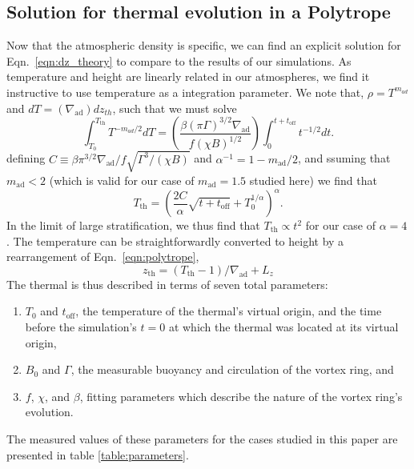 \documentclass[twocolumn, amsmath, amsfonts, amssymb, trackchanges]{aastex62}
\newcommand{\grad}{\ensuremath{\nabla}}
\begin{document}
\subsection{Solution for thermal evolution in a Polytrope}
Now that the atmospheric density is specific, we can 
find an explicit solution for Eqn.~\ref{eqn:dz_theory} to compare
to the results of our simulations. As temperature and height are
linearly related in our atmospheres, we find it instructive to use
temperature as a integration parameter.
We note that, $\rho = T^{m_{ad}}$ and
$dT = (\grad_{\text{ad}}) dz_{th}$, such that we must solve
\begin{equation}
\int_{T_0}^{T_{\text{th}}} T^{-m_{ad}/2} dT 
= \left(\frac{\beta(\pi\Gamma)^{3/2}\grad_{\text{ad}}}{f(\chi B)^{1/2}}\right)
\int_{0}^{t + t_{\text{off}}} t^{-1/2} dt.
\end{equation}
defining $C \equiv \beta \pi^{3/2} \grad_{\text{ad}} / f \sqrt{\Gamma^3/(\chi B)}$
and $\alpha^{-1} = 1 - m_{\text{ad}}/2$, and 
ssuming that $m_{\text{ad}} < 2$ (which is valid for our case of $m_{\text{ad}} = 1.5$
studied here) we find that
\begin{equation}
T_{\text{th}} = \left(\frac{2C}{ \alpha } \sqrt{t + t_{\text{off}}} + T_0^{1/\alpha}  \right)^{\alpha}.
\label{eqn:theory_T}
\end{equation}
In the limit of large stratification, we thus find that $T_{\text{th}} \propto t^2$ for
our case of $\alpha = 4$. The temperature can be straightforwardly converted to height
by a rearrangement of Eqn.~\ref{eqn:polytrope},
\begin{equation}
z_{\text{th}} = (T_{\text{th}} - 1)/\grad_{\text{ad}} + L_z
\end{equation}
The thermal is thus described in terms of seven total parameters:
\begin{enumerate}
\item $T_0$ and $t_{\text{off}}$, the temperature of the thermal's virtual origin, and
the time before the simulation's $t = 0$ at which the thermal was located at its virtual origin,
\item $B_0$ and $\Gamma$, the measurable buoyancy and circulation of the vortex ring, and
\item $f$, $\chi$, and $\beta$, fitting parameters which describe the nature of the vortex
ring's evolution.
\end{enumerate}
The measured values of these parameters for the cases studied in this paper are presented
in table \ref{table:parameters}.
\end{document}

